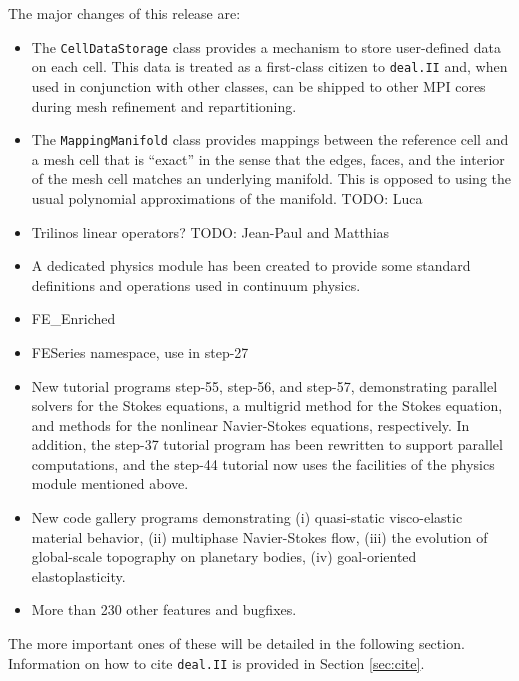 \documentclass{ansarticle-preprint}
\newcommand{\specialword}[1]{\texttt{#1}}
\newcommand{\dealii}{{\specialword{deal.II}}}
\begin{document}
The major changes of this release are:
\begin{itemize}
\item The \texttt{CellDataStorage} class provides a mechanism to store user-defined data on each cell.
This data is treated as a first-class citizen to \dealii{} and, when used in conjunction with other classes, can be shipped to other MPI cores during mesh refinement and repartitioning. 

\item The \texttt{MappingManifold} class provides mappings between the
  reference cell and a mesh cell that is ``exact'' in the sense that
  the edges, faces, and the interior of the mesh cell matches an
  underlying manifold. This is opposed to using the usual polynomial
  approximations of the manifold.
  TODO: Luca

\item Trilinos linear operators?
  TODO: Jean-Paul and Matthias

\item A dedicated physics module has been created to provide some standard definitions and operations used in continuum physics.

\item FE\_Enriched

\item FESeries namespace, use in step-27

\item New tutorial programs step-55, step-56, and step-57,
  demonstrating parallel solvers for the Stokes equations, a multigrid
  method for the Stokes equation, and methods for the nonlinear
  Navier-Stokes equations, respectively. In addition, the step-37
  tutorial program has been rewritten to support parallel
  computations, and the step-44 tutorial now uses the facilities of
  the physics module mentioned above.

\item New code gallery programs demonstrating (i) quasi-static
  visco-elastic material behavior, (ii) multiphase Navier-Stokes flow,
  (iii) the evolution of global-scale topography on planetary bodies,
  (iv) goal-oriented elastoplasticity.


\item More than 230 other features and bugfixes.
\end{itemize}
The more important ones of these will be detailed in the following section.
Information on how to cite \dealii{} is provided in Section \ref{sec:cite}.
\end{document}
